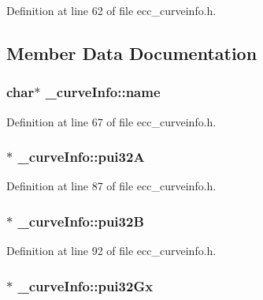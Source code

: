 Definition at line 62 of file ecc\+\_\+curveinfo.\+h.



\subsection{Member Data Documentation}
\subsubsection[{\texorpdfstring{name}{name}}]{\setlength{\rightskip}{0pt plus 5cm}char$\ast$ \+\_\+curve\+Info\+::name}\hypertarget{struct__curve_info_a5a7b1d57036dacaa60f1e60b4b38810f}{}\label{struct__curve_info_a5a7b1d57036dacaa60f1e60b4b38810f}


Definition at line 67 of file ecc\+\_\+curveinfo.\+h.

\subsubsection[{\texorpdfstring{pui32A}{pui32A}}]{$\ast$ \+\_\+curve\+Info\+::pui32A}\hypertarget{struct__curve_info_aada25fbc79f3b7f2b9752f756ca54d4f}{}\label{struct__curve_info_aada25fbc79f3b7f2b9752f756ca54d4f}


Definition at line 87 of file ecc\+\_\+curveinfo.\+h.

\subsubsection[{\texorpdfstring{pui32B}{pui32B}}]{$\ast$ \+\_\+curve\+Info\+::pui32B}\hypertarget{struct__curve_info_a8a13e3aa2a7ec1b09a765a058d64cc27}{}\label{struct__curve_info_a8a13e3aa2a7ec1b09a765a058d64cc27}


Definition at line 92 of file ecc\+\_\+curveinfo.\+h.

\subsubsection[{\texorpdfstring{pui32\+Gx}{pui32Gx}}]{$\ast$ \+\_\+curve\+Info\+::pui32\+Gx}\hypertarget{struct__curve_info_a06c588a16a514e0df0744a5cb8dc18f2}{}\label{struct__curve_info_a06c588a16a514e0df0744a5cb8dc18f2}



